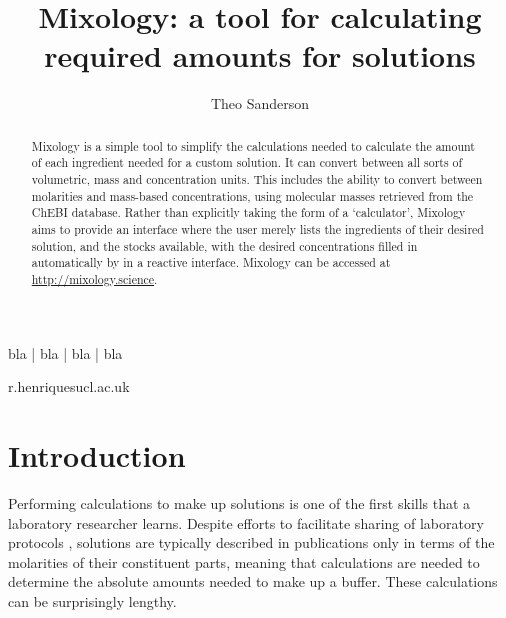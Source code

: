 \documentclass[times, twoside, watermark]{zHenriquesLab-StyleBioRxiv}
\begin{document}
\noindent%

\title{Mixology: a tool for calculating required amounts for solutions}

\author[1,\Letter]{Theo Sanderson}


\maketitle

\begin{abstract}
Mixology is a simple tool to simplify the calculations needed to calculate the amount of each ingredient needed for a custom solution. It can convert between all sorts of volumetric, mass and concentration units. This includes the ability to convert between molarities and mass-based concentrations, using molecular masses retrieved from the ChEBI database. Rather than explicitly taking the form of a `calculator', Mixology aims to provide an interface where the user merely lists the ingredients of their desired solution, and the stocks available, with the desired concentrations filled in automatically by in a reactive interface. Mixology can be accessed at \url{http://mixology.science}.
\end {abstract}

\begin{keywords}
bla | bla | bla | bla
\end{keywords}

\begin{corrauthor}
r.henriques\at ucl.ac.uk
\end{corrauthor}

\section*{Introduction}
Performing calculations to make up solutions is one of the first skills that a laboratory researcher learns. Despite efforts to facilitate sharing of laboratory protocols \cite{TeytelmanStoliartchouk2015}, solutions are typically described in publications only in terms of the molarities of their constituent parts, meaning that calculations are needed to determine the absolute amounts needed to make up a buffer.  These calculations can be surprisingly lengthy.
\end{document}
